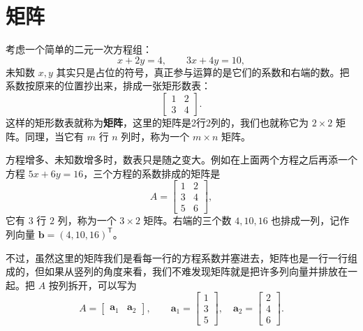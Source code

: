 \documentclass[UTF8,a4paper,12pt]{ctexart}
\numberwithin{equation}{section}
\newcommand{\trans}{^{\mathsf T}}
\begin{document}
	\section{矩阵}
	
	考虑一个简单的二元一次方程组：
	\begin{equation}\label{eq:3.1}
	x+2y=4,
	\qquad
	3x+4y=10,
	\end{equation}
	未知数 $x,y$ 其实只是占位的符号，真正参与运算的是它们的系数和右端的数。把系数按原来的位置抄出来，排成一张矩形数表：
	\begin{equation}\label{eq:3.2}
	\begin{bmatrix}
		1&2\\
		3&4
	\end{bmatrix}.
	\end{equation}
	这样的矩形数表就称为\textbf{矩阵}，这里的矩阵是2行2列的，我们也就称它为 $2\times 2$ 矩阵。同理，当它有 $m$ 行 $n$ 列时，称为一个 $m\times n$ 矩阵。
	
	方程增多、未知数增多时，数表只是随之变大。例如在上面两个方程之后再添一个方程 $5x+6y=16$，三个方程的系数排成的矩阵是
	\begin{equation}\label{eq:3.3}
	A=
	\begin{bmatrix}
		1&2\\
		3&4\\
		5&6
	\end{bmatrix},
	\end{equation}
	它有 $3$ 行 $2$ 列，称为一个 $3\times 2$ 矩阵。右端的三个数 $4,10,16$ 也排成一列，记作列向量 $\bm{b}=(4,10,16)\trans$。
	
	不过，虽然这里的矩阵我们是看每一行的方程系数并塞进去，矩阵也是一行一行组成的，但如果从竖列的角度来看，我们不难发现矩阵就是把许多列向量并排放在一起。把 $A$ 按列拆开，可以写为
	\begin{equation}\label{eq:3.4}
	A=
	\begin{bmatrix}
		\bm{a}_1 & \bm{a}_2
	\end{bmatrix},
	\qquad
	\bm{a}_1=
	\begin{bmatrix}
		1\\3\\5
	\end{bmatrix},
	\quad
	\bm{a}_2=
	\begin{bmatrix}
		2\\4\\6
	\end{bmatrix}.
	\end{equation}
	
\end{document}
